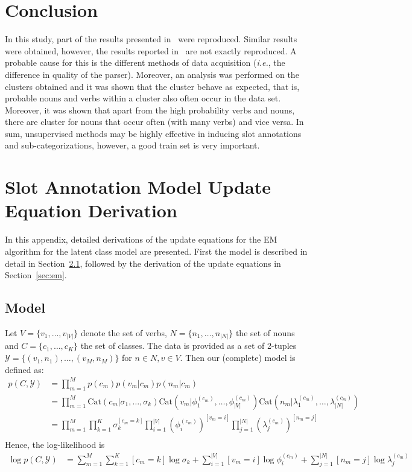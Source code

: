 \documentclass[11pt]{scrartcl}
\newcommand{\ie}{\textit{i.e.}}
\newcommand{\cat}{\text{Cat}}
\begin{document}
\section{Conclusion} %
In this study, part of the results presented
in~\cite{rooth1999inducing} were reproduced. Similar results were
obtained, however, the results reported in~\cite{rooth1999inducing}
are not exactly reproduced. A probable cause for this is the different
methods of data acquisition (\ie, the difference in quality of the
parser). Moreover, an analysis was performed on the clusters obtained
and it was shown that the cluster behave as expected, that is,
probable nouns and verbs within a cluster also often occur in the data
set. Moreover, it was shown that apart from the high probability verbs
and nouns, there are cluster for nouns that occur often (with many
verbs) and vice versa. In sum, unsupervised methods may be highly
effective in inducing slot annotations and sub-categorizations,
however, a good train set is very important.




\onecolumn
\appendix
\section{Slot Annotation Model Update Equation Derivation}
\label{sec:part1}
In this appendix, detailed derivations of the update equations for the
EM algorithm for the latent class model are presented. First the model
is described in detail in Section~\ref{sec:model}, followed by the
derivation of the update equations in Section~\ref{sec:em}.

\subsection{Model}
\label{sec:model}
Let $V = \{v_1, \ldots, v_{|V|}\}$ denote the set of verbs, $N =
\{n_1, \ldots, n_{|N|}\}$ the set of nouns and $C = \{c_1,\ldots,
c_K\}$ the set of classes. The data is provided as a set of 2-tuples
$\mathcal{Y} = \{(v_1, n_1), \ldots, (v_M, n_M)\}$ for $n \in N, v \in V$.  Then our
(complete) model is defined as:
\begin{align}
  p(C, \mathcal{Y}) &= \prod_{m=1}^{M}p(c_m)p(v_m|c_m)p(n_m|c_m) \\
             &= \prod_{m=1}^{M}
                \cat(c_m|\sigma_1, \ldots, \sigma_k)
                \cat(v_m|\phi_1^{(c_m)}, \ldots, \phi_{|V|}^{(c_m)})
                \cat(n_m|\lambda_1^{(c_m)}, \ldots, \lambda_{|N|}^{(c_m)}) \\
             &= \prod_{m=1}^{M}
                \prod_{k=1}^K \sigma_k^{[c_m=k]} 
                \prod_{i=1}^{|V|} {(\phi_i^{(c_m)})}^{[v_m=i]}
                \prod_{j=1}^{|N|} {(\lambda_j^{(c_m)})}^{[n_m=j]} \\
 \end{align}
 Hence, the log-likelihood is
 \begin{align}
   \log p(C, \mathcal{Y})
   &=
     \sum_{m=1}^{M}
     \sum_{k=1}^K [c_m = k]\log \sigma_k +
     \sum_{i=1}^{|V|} [v_m = i]\log \phi_i^{(c_m)} +
     \sum_{j=1}^{|N|} [n_m = j]\log \lambda_j^{(c_m)}
 \end{align}
\end{document}

